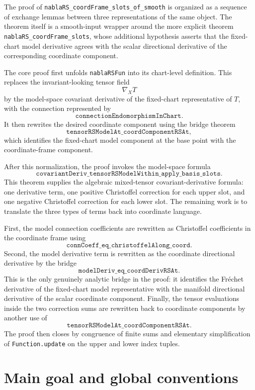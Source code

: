 \documentclass[11pt]{article}
\theoremstyle{plain}
\theoremstyle{definition}
\theoremstyle{remark}
\begin{document}
The proof of \texttt{nablaRS\_coordFrame\_slots\_of\_smooth} is organized as a
sequence of exchange lemmas between three representations of the same object.
The theorem itself is a smooth-input wrapper around the more explicit theorem
\texttt{nablaRS\_coordFrame\_slots}, whose additional hypothesis asserts that
the fixed-chart model derivative agrees with the scalar directional derivative
of the corresponding coordinate component.

The core proof first unfolds \texttt{nablaRSFun} into its chart-level
definition.  This replaces the invariant-looking tensor field
\[
  \nabla_XT
\]
by the model-space covariant derivative of the fixed-chart representative of
$T$, with the connection represented by
\[
  \texttt{connectionEndomorphismInChart}.
\]
It then rewrites the desired coordinate component using the bridge theorem
\[
  \texttt{tensorRSModelAt\_coordComponentRSAt},
\]
which identifies the fixed-chart model component at the base point with the
coordinate-frame component.

After this normalization, the proof invokes the model-space formula
\[
  \texttt{covariantDeriv\_tensorRSModelWithin\_apply\_basis\_slots}.
\]
This theorem supplies the algebraic mixed-tensor covariant-derivative formula:
one derivative term, one positive Christoffel correction for each upper slot,
and one negative Christoffel correction for each lower slot.  The remaining work
is to translate the three types of terms back into coordinate language.

First, the model connection coefficients are rewritten as Christoffel
coefficients in the coordinate frame using
\[
  \texttt{connCoeff\_eq\_christoffelAlong\_coord}.
\]
Second, the model derivative term is rewritten as the coordinate directional
derivative by the bridge
\[
  \texttt{modelDeriv\_eq\_coordDerivRSAt}.
\]
This is the only genuinely analytic bridge in the proof: it identifies the
Fr\'echet derivative of the fixed-chart model representative with the manifold
directional derivative of the scalar coordinate component.  Finally, the tensor
evaluations inside the two correction sums are rewritten back to coordinate
components by another use of
\[
  \texttt{tensorRSModelAt\_coordComponentRSAt}.
\]
The proof then closes by congruence of finite sums and elementary simplification
of \texttt{Function.update} on the upper and lower index tuples.



\section{Main goal and global conventions}
\end{document}
